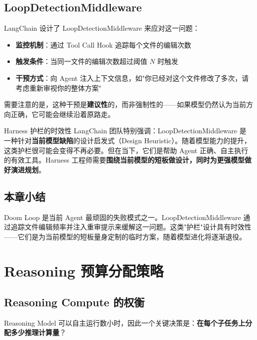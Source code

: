 \documentclass[a4paper]{article}
\begin{document}
\subsection{LoopDetectionMiddleware}

LangChain 设计了 LoopDetectionMiddleware 来应对这一问题：

\begin{itemize}[leftmargin=1.5em]
    \item \textbf{监控机制}：通过 Tool Call Hook 追踪每个文件的编辑次数
    \item \textbf{触发条件}：当同一文件的编辑次数超过阈值 $N$ 时触发
    \item \textbf{干预方式}：向 Agent 注入上下文信息，如"你已经对这个文件修改了多次，请考虑重新审视你的整体方案"
\end{itemize}

需要注意的是，这种干预是\textbf{建议性}的，而非强制性的——如果模型仍然认为当前方向正确，它可能会继续沿着原路走。

\begin{knowledgebox}{Harness 护栏的时效性}
LangChain 团队特别强调：LoopDetectionMiddleware 是一种针对\textbf{当前模型缺陷}的设计启发式（Design Heuristic）。随着模型能力的提升，这类护栏很可能会变得不再必要。但在当下，它们是帮助 Agent 正确、自主执行的有效工具。Harness 工程师需要\textbf{围绕当前模型的短板做设计，同时为更强模型做好演进规划}。
\end{knowledgebox}

\subsection{本章小结}

Doom Loop 是当前 Agent 最顽固的失败模式之一。LoopDetectionMiddleware 通过追踪文件编辑频率并注入重审提示来缓解这一问题。这类"护栏"设计具有时效性——它们是为当前模型的短板量身定制的临时方案，随着模型进化将逐渐退役。


\section{Reasoning 预算分配策略}

\subsection{Reasoning Compute 的权衡}

Reasoning Model 可以自主运行数小时，因此一个关键决策是：\textbf{在每个子任务上分配多少推理计算量}？
\end{document}
